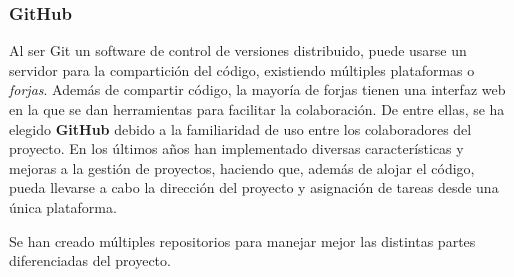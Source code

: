 
\subsubsection{GitHub}

Al ser Git un software de control de versiones distribuido, puede usarse un servidor para la compartición del código, existiendo múltiples plataformas o \textit{forjas}. Además de compartir código, la mayoría de forjas tienen una interfaz web en la que se dan herramientas para facilitar la colaboración. De entre ellas, se ha elegido \textbf{GitHub} debido a la familiaridad de uso entre los colaboradores del proyecto. En los últimos años han implementado diversas características y mejoras a la gestión de proyectos, haciendo que, además de alojar el código, pueda llevarse a cabo la dirección del proyecto y asignación de tareas desde una única plataforma.


Se han creado múltiples repositorios para manejar mejor las distintas partes diferenciadas del proyecto.

